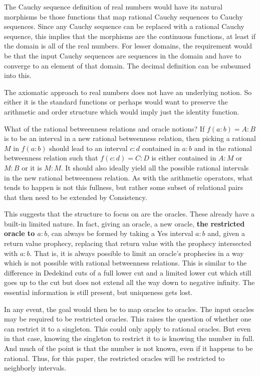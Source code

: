 \documentclass[12pt]{article}
\begin{document}
The Cauchy sequence definition of real numbers would have its natural morphisms be those functions that map rational Cauchy sequences to Cauchy sequences. Since any Cauchy sequence can be replaced with a rational Cauchy sequence, this implies that the morphisms are the continuous functions, at least if the domain is all of the real numbers. For lesser domains, the requirement would be that the input Cauchy sequences are sequences in the domain and have to converge to an element of that domain. The decimal definition can be subsumed into this. 

The axiomatic approach to real numbers does not have an underlying notion. So either it is the standard functions or perhaps would want to preserve the arithmetic and order structure which would imply just the identity function. 

What of the rational betweenness relations and oracle notions? If $f(a:b)=A:B$ is to be an interval in a new rational betweenness relation, then picking a rational $M$ in $f(a:b)$ should lead to an interval $c:d$ contained in $a:b$ and in the rational betweenness relation such that $f(c:d) =C:D$ is either contained in $A:M$ or $M:B$ or it is $M:M$. It should also ideally yield all the possible rational intervals in the new rational betweenness relation. As with the arithmetic operators, what tends to happen is not this fullness, but rather some subset of relational pairs that then need to be extended by Consistency. 

This suggests that the structure to focus on are the oracles. These already have a built-in limited nature. In fact, giving an oracle, a new oracle, \textbf{the restricted oracle to $a:b$}, can always be formed by taking a Yes interval $a:b$ and, given a return value prophecy, replacing that return value with the prophecy intersected with $a:b$. That is, it is always possible to limit an oracle's prophecies in a way which is not possible with rational betweenness relations. This is similar to the difference in Dedekind cuts of a full lower cut and a limited lower cut which still goes up to the cut but does not extend all the way down to negative infinity. The essential information is still present, but uniqueness gets lost.

In any event, the goal would then be to map oracles to oracles. The input oracles may be required to be restricted oracles. This raises the question of whether one can restrict it to a singleton. This could only apply to rational oracles. But even in that case, knowing the singleton to restrict it to is knowing the number in full. And much of the point is that the number is not known, even if it happens to be rational. Thus, for this paper, the restricted oracles will be restricted to neighborly intervals. 
\end{document}
